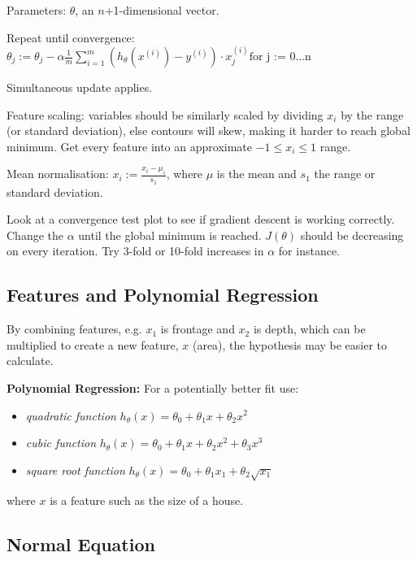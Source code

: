 \documentclass[12pt] {article}
\begin{document}
    Parameters: $\theta$, an $n$+1-dimensional vector.

    Repeat until convergence: 
    $\theta_j := \theta_j - \alpha \frac{1}{m} \sum\limits_{i=1}^{m} 
      (h_\theta(x^{(i)}) - y^{(i)}) \cdot x_j^{(i)} \text{for j := 0...n}$
    
    Simultaneous update applies.

    Feature scaling: variables should be similarly scaled by dividing $x_i$
      by the range (or standard deviation), else contours will skew, making 
      it harder to reach global minimum. Get every feature into an 
      approximate $-1 \leq x_i \leq 1$ range. 
    
    Mean normalisation: $x_i := \frac{x_i - \mu_i}{s_1}$, where $\mu$ is
      the mean and $s_1$ the range or standard deviation.

    Look at a convergence test plot to see if gradient descent is working
      correctly. Change the $\alpha$ until the global minimum is reached. 
      $J(\theta)$ should be decreasing on every iteration. Try 3-fold or 
      10-fold increases in $\alpha$ for instance. 

  \subsection{Features and Polynomial Regression}

    By combining features, e.g. $x_1$ is frontage and $x_2$ is depth, which
    can be multiplied to create a new feature, $x$ (area), the hypothesis 
    may be easier to calculate. 

    \textbf{Polynomial Regression:} For a potentially better fit use:
    \begin{itemize}
      \item \emph{quadratic function} $h_\theta(x) = \theta_0 + \theta_1x + 
        \theta_2x^2$ 
      \item \emph{cubic function} $h_\theta(x) = \theta_0 + \theta_1x + 
        \theta_2x^2 + \theta_3x^3$
      \item \emph{square root function} $h_\theta(x) = \theta_0 + 
        \theta_1 x_1 + \theta_2 \sqrt{x_1}$
    \end{itemize}
    where $x$ is a feature such as the size of a house.

  \subsection{Normal Equation}
\end{document}
